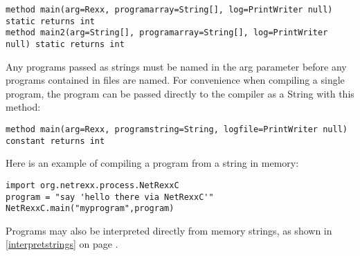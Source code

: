 {\begin{lstlisting}[label=frommemory,caption=From Memory]
method main(arg=Rexx, programarray=String[], log=PrintWriter null) static returns int
method main2(arg=String[], programarray=String[], log=PrintWriter null) static returns int
\end{lstlisting}

Any programs passed as strings must be named in the arg parameter before any programs contained in files are named.
For convenience when compiling a single program, the program can be
passed directly to the compiler as a String with this method:

\begin{lstlisting}[label=string,caption=With String argument]
method main(arg=Rexx, programstring=String, logfile=PrintWriter null) constant returns int
\end{lstlisting}

Here is an example of compiling a \nr{}program from a string in
memory:

\begin{lstlisting}[label=memexample,caption=Example of compiling from String]
import org.netrexx.process.NetRexxC
program = "say 'hello there via NetRexxC'"
NetRexxC.main("myprogram",program)
\end{lstlisting}

}Programs may also be interpreted directly from memory strings, as
shown in \ref{interpretstrings} on page \pageref{interpretstrings}.

